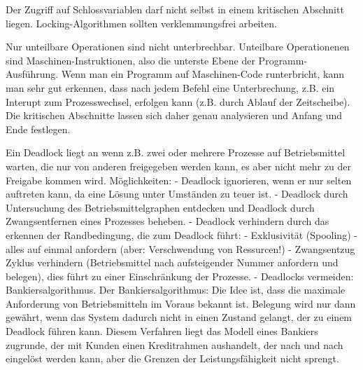 \begin{answer}
Der Zugriff auf Schlossvariablen darf nicht selbst in einem kritischen Abschnitt liegen. Locking-Algorithmen sollten verklemmungsfrei arbeiten.
\end{answer}

\begin{answer}
Nur unteilbare Operationen sind nicht unterbrechbar. Unteilbare Operationenen sind Maschinen-Instruktionen, also die unterste Ebene der Programm-Ausführung.
Wenn man ein Programm auf Maschinen-Code runterbricht, kann man sehr gut erkennen, dass nach jedem Befehl eine Unterbrechung, z.B. ein Interupt zum Prozesswechsel, erfolgen kann (z.B. durch Ablauf der Zeitscheibe). Die kritischen Abschnitte lassen sich daher genau analysieren und Anfang und Ende festlegen.
\end{answer}

\begin{answer}
Ein Deadlock liegt an wenn z.B. zwei oder mehrere Prozesse auf Betriebsmittel warten, die nur
von anderen freigegeben werden kann, es aber nicht mehr zu der Freigabe kommen wird.
Möglichkeiten:
- Deadlock ignorieren, wenn er nur selten auftreten kann, da eine Lösung unter Umständen zu
teuer ist.
- Deadlock durch Untersuchung des Betriebsmittelgraphen entdecken und Deadlock durch Zwangsentfernen
eines Prozesses beheben.
- Deadlock verhindern durch das erkennen der Randbedingung, die zum Deadlock führt:
- Exklusivität (Spooling)
- alles auf einmal anfordern (aber: Verschwendung von Ressurcen!)
- Zwangsentzug
Zyklus verhindern (Betriebsmittel nach aufsteigender Nummer anfordern und belegen), dies führt
zu einer Einschränkung der Prozesse.
- Deadlocks vermeiden: Bankiersalgorithmus.
Der Bankiersalgorithmus:
Die Idee ist, dass die maximale Anforderung von Betriebsmitteln im Voraus bekannt ist. Belegung
wird nur dann gewährt, wenn das System dadurch nicht in einen Zustand gelangt, der zu einem
Deadlock führen kann. Diesem Verfahren liegt das Modell eines Bankiers zugrunde, der mit Kunden
einen Kreditrahmen aushandelt, der nach und nach eingelöst werden kann, aber die Grenzen der
Leistungsfähigkeit nicht sprengt.
\end{answer}

